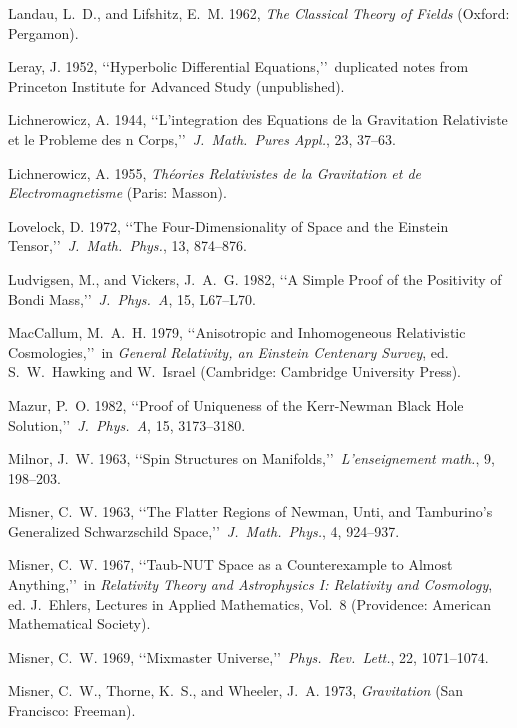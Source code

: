 
\item Landau, L.~D., and Lifshitz, E.~M. 1962, \emph{The Classical Theory of Fields} (Oxford: Pergamon).
\item Leray, J. 1952, \lq\lq Hyperbolic Differential Equations,\rq\rq\ duplicated notes from Princeton Institute for Advanced Study (unpublished).
\item Lichnerowicz, A. 1944, \lq\lq L'integration des Equations de la Gravitation Relativiste et le Probleme des n Corps,\rq\rq\ \emph{J.\ Math.\ Pures Appl.}, 23, 37--63.
\item Lichnerowicz, A. 1955, \emph{Th\'eories Relativistes de la Gravitation et de Electromagnetisme} (Paris: Masson).
\item Lovelock, D. 1972, \lq\lq The Four-Dimensionality of Space and the Einstein Tensor,\rq\rq\ \emph{J.\ Math.\ Phys.}, 13, 874--876.
\item Ludvigsen, M., and Vickers, J.~A.~G. 1982, \lq\lq A Simple Proof of the Positivity of Bondi Mass,\rq\rq\ \emph{J.\ Phys.\ A}, 15, L67--L70.
\item MacCallum, M.~A.~H. 1979, \lq\lq Anisotropic and Inhomogeneous Relativistic Cosmologies,\rq\rq\ in \emph{General Relativity, an Einstein Centenary Survey}, ed. S.~W.~Hawking and W.~Israel (Cambridge: Cambridge University Press).
\item Mazur, P.~O. 1982, \lq\lq Proof of Uniqueness of the Kerr-Newman Black Hole Solution,\rq\rq\ \emph{J.\ Phys.\ A}, 15, 3173--3180.
\item Milnor, J.~W. 1963, \lq\lq Spin Structures on Manifolds,\rq\rq\ \emph{L'enseignement math.}, 9, 198--203.
\item Misner, C.~W. 1963, \lq\lq The Flatter Regions of Newman, Unti, and Tamburino's Generalized Schwarzschild Space,\rq\rq\ \emph{J.\ Math.\ Phys.}, 4, 924--937.
\item Misner, C.~W. 1967, \lq\lq Taub-NUT Space as a Counterexample to Almost Anything,\rq\rq\ in \emph{Relativity Theory and Astrophysics I: Relativity and Cosmology}, ed. J.~Ehlers, Lectures in Applied Mathematics, Vol.~8 (Providence: American Mathematical Society).
\item Misner, C.~W. 1969, \lq\lq Mixmaster Universe,\rq\rq\ \emph{Phys.\ Rev.\ Lett.}, 22, 1071--1074.
\item Misner, C.~W., Thorne, K.~S., and Wheeler, J.~A. 1973, \emph{Gravitation} (San Francisco: Freeman).

